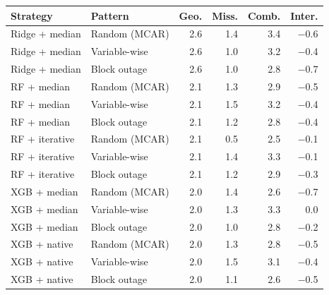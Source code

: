 \begin{tabular}{llrrrr}
\toprule
Strategy & Pattern & Geo. & Miss. & Comb. & Inter. \\
\midrule
Ridge + median & Random (MCAR) & 2.6 & 1.4 & 3.4 & $-$0.6 \\
Ridge + median & Variable-wise & 2.6 & 1.0 & 3.2 & $-$0.4 \\
Ridge + median & Block outage & 2.6 & 1.0 & 2.8 & $-$0.7 \\
RF + median & Random (MCAR) & 2.1 & 1.3 & 2.9 & $-$0.5 \\
RF + median & Variable-wise & 2.1 & 1.5 & 3.2 & $-$0.4 \\
RF + median & Block outage & 2.1 & 1.2 & 2.8 & $-$0.4 \\
RF + iterative & Random (MCAR) & 2.1 & 0.5 & 2.5 & $-$0.1 \\
RF + iterative & Variable-wise & 2.1 & 1.4 & 3.3 & $-$0.1 \\
RF + iterative & Block outage & 2.1 & 1.2 & 2.9 & $-$0.3 \\
XGB + median & Random (MCAR) & 2.0 & 1.4 & 2.6 & $-$0.7 \\
XGB + median & Variable-wise & 2.0 & 1.3 & 3.3 & 0.0 \\
XGB + median & Block outage & 2.0 & 1.0 & 2.8 & $-$0.2 \\
XGB + native & Random (MCAR) & 2.0 & 1.3 & 2.8 & $-$0.5 \\
XGB + native & Variable-wise & 2.0 & 1.5 & 3.1 & $-$0.4 \\
XGB + native & Block outage & 2.0 & 1.1 & 2.6 & $-$0.5 \\
\bottomrule
\end{tabular}
